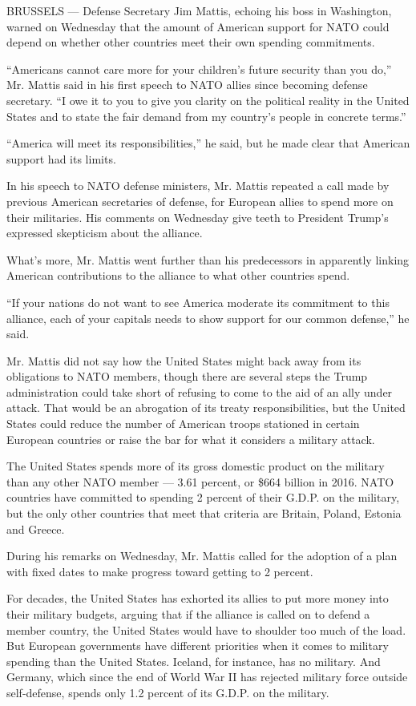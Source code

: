 BRUSSELS --- Defense Secretary Jim Mattis, echoing his boss in
Washington, warned on Wednesday that the amount of American support for
NATO could depend on whether other countries meet their own spending
commitments.

``Americans cannot care more for your children's future security than
you do,'' Mr. Mattis said in his first speech to NATO allies since
becoming defense secretary. ``I owe it to you to give you clarity on the
political reality in the United States and to state the fair demand from
my country's people in concrete terms.''

``America will meet its responsibilities,'' he said, but he made clear
that American support had its limits.

In his speech to NATO defense ministers, Mr. Mattis repeated a call made
by previous American secretaries of defense, for European allies to
spend more on their militaries. His comments on Wednesday give teeth to
President Trump's expressed skepticism about the alliance.

What's more, Mr. Mattis went further than his predecessors in apparently
linking American contributions to the alliance to what other countries
spend.

``If your nations do not want to see America moderate its commitment to
this alliance, each of your capitals needs to show support for our
common defense,'' he said.

Mr. Mattis did not say how the United States might back away from its
obligations to NATO members, though there are several steps the Trump
administration could take short of refusing to come to the aid of an
ally under attack. That would be an abrogation of its treaty
responsibilities, but the United States could reduce the number of
American troops stationed in certain European countries or raise the bar
for what it considers a military attack.

The United States spends more of its gross domestic product on the
military than any other NATO member --- 3.61 percent, or \$664 billion
in 2016. NATO countries have committed to spending 2 percent of their
G.D.P. on the military, but the only other countries that meet that
criteria are Britain, Poland, Estonia and Greece.

During his remarks on Wednesday, Mr. Mattis called for the adoption of a
plan with fixed dates to make progress toward getting to 2 percent.

For decades, the United States has exhorted its allies to put more money
into their military budgets, arguing that if the alliance is called on
to defend a member country, the United States would have to shoulder too
much of the load. But European governments have different priorities
when it comes to military spending than the United States. Iceland, for
instance, has no military. And Germany, which since the end of World War
II has rejected military force outside self-defense, spends only 1.2
percent of its G.D.P. on the military.

